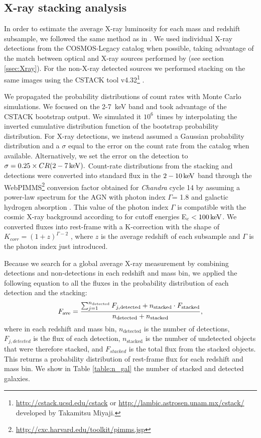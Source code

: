 \subsection{X-ray stacking analysis} \label{sec:stacking}
In order to estimate the average X-ray luminosity for each mass and redshift subsample, we followed the same method as in \citet{2015ApJ...800L..10R}. We used individual X-ray detections from the COSMOS-Legacy catalog \citep{2016ApJ...819...62C} when possible, taking advantage of the match between optical and X-ray sources performed by \citet{2016ApJ...817...34M} (see section \ref{ssec:Xray}). For the non-X-ray detected sources we performed stacking on the same images using the CSTACK tool v4.32\footnote{\url{http://cstack.ucsd.edu/cstack} or \url{http://lambic.astrosen.unam.mx/cstack/} developed by Takamitsu Miyaji.}  \citep{2008HEAD...10.0401M}.

We propagated the probability distributions of count rates with Monte Carlo simulations. We focused on the 2-7~keV band and took advantage of the CSTACK bootstrap output. We simulated it $10^6$~times by interpolating the inverted cumulative distribution function of the bootstrap probability distribution.
For X-ray detections, we instead assumed a Gaussian probability distribution and a $\sigma$ equal to the error on the count rate from the catalog when available. Alternatively, we set the error on the detection to $\sigma=0.25 \times CR(2-7\,\mathrm{keV}).$  Count-rate distributions from the stacking and detections were converted into standard flux in the $2-10\,\mathrm{keV}$ band through the WebPIMMS\footnote{\url{http://cxc.harvard.edu/toolkit/pimms.jsp}} conversion factor obtained for \textit{Chandra} cycle 14
by assuming a power-law spectrum for the AGN with photon index $\Gamma$= 1.8 and galactic hydrogen absorption \citep[N$_H=2.6\times 10^{20} \ump{cm}{-2}$,][]{2005A&A...440..775K}.
This value of the photon index $\Gamma$ is compatible with the cosmic X-ray background according to \citet{2019ApJ...871..240A} for cutoff energies E$_c<100\,\mathrm{keV}$.
We converted fluxes into rest-frame with a K-correction with the shape of $K_{corr}=(1+z)^{\Gamma-2}$ , where $z$ is the average redshift of each subsample and $\Gamma$ is the photon index just introduced.

Because we search for a global average X-ray measurement by combining detections and non-detections in each redshift and mass bin, we applied the following equation to all the fluxes in the probability distribution of each detection and the stacking:
\begin{equation}  \label{eq:F_ave}
\centering
F_\text{ave}=\frac{\sum_{j=1}^{n_{\text{detected}}}F_{j,\text{detected}}+n_{\text{stacked}}\cdot F_{\text{stacked}}}{n_{\text{detected}}+n_{\text{stacked}}}
,\end{equation}
where in each redshift and mass bin, $n_{\text{detected}}$ is the number of detections, $F_{j,detected}$ is the flux of each detection, $n_{\text{stacked}}$ is the number of undetected objects that were therefore stacked, and $F_{stacked}$ is the total flux from the stacked objects. This returns a probability distribution of rest-frame flux for each redshift and mass bin. We show in Table \ref{table:n_gal} the number of stacked and detected galaxies.

